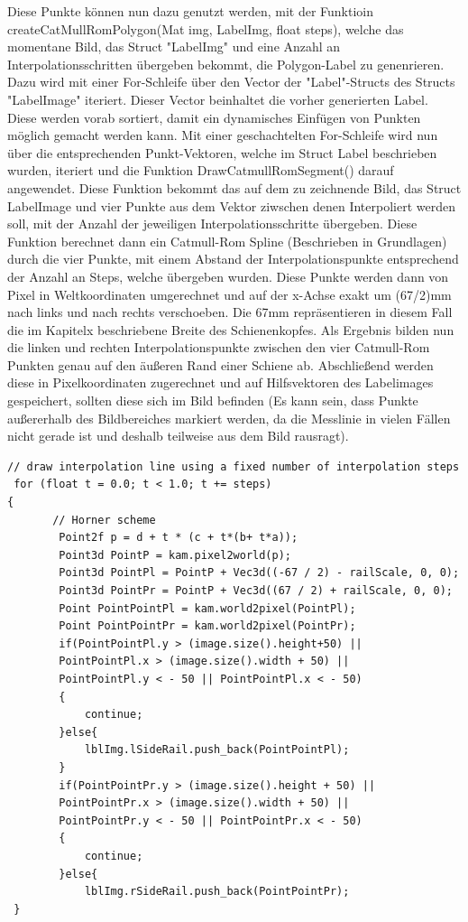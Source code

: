 \documentclass[11pt]{scrartcl}
\begin{document}
\noindent
Diese Punkte können nun dazu genutzt werden, mit der Funktioin createCatMullRomPolygon(Mat img, LabelImg, float steps), welche das momentane Bild, das Struct "LabelImg" und eine Anzahl an Interpolationsschritten übergeben bekommt, die Polygon-Label zu genenrieren. Dazu wird mit einer For-Schleife über den Vector der "Label"-Structs des Structs "LabelImage" iteriert. Dieser Vector beinhaltet die vorher generierten Label. Diese werden vorab sortiert, damit ein dynamisches Einfügen von Punkten möglich gemacht werden kann. Mit einer geschachtelten For-Schleife wird nun über die entsprechenden Punkt-Vektoren, welche im Struct Label beschrieben wurden, iteriert und die Funktion DrawCatmullRomSegment() darauf angewendet. Diese Funktion bekommt das auf dem zu zeichnende Bild, das Struct LabelImage und vier Punkte aus dem Vektor ziwschen denen Interpoliert werden soll, mit der Anzahl der jeweiligen Interpolationsschritte übergeben. Diese Funktion berechnet dann ein Catmull-Rom Spline (Beschrieben in Grundlagen) durch die vier Punkte, mit einem Abstand der Interpolationspunkte entsprechend der Anzahl an Steps, welche übergeben wurden. Diese Punkte werden dann von Pixel in Weltkoordinaten umgerechnet und auf der x-Achse exakt um (67/2)mm nach links und nach rechts verschoeben. Die 67mm repräsentieren in diesem Fall die im Kapitelx beschriebene Breite des Schienenkopfes. Als Ergebnis bilden nun die linken und rechten Interpolationspunkte zwischen den vier Catmull-Rom Punkten genau auf den äußeren Rand einer Schiene ab. Abschließend werden diese in Pixelkoordinaten zugerechnet und auf Hilfsvektoren des Labelimages gespeichert, sollten diese sich im Bild befinden (Es kann sein, dass Punkte außererhalb des Bildbereiches markiert werden, da die Messlinie in vielen Fällen nicht gerade ist und deshalb teilweise aus dem Bild rausragt). 
\begin{lstlisting}  
// draw interpolation line using a fixed number of interpolation steps
 for (float t = 0.0; t < 1.0; t += steps)
{   
       // Horner scheme
        Point2f p = d + t * (c + t*(b+ t*a));
        Point3d PointP = kam.pixel2world(p);
        Point3d PointPl = PointP + Vec3d((-67 / 2) - railScale, 0, 0);
        Point3d PointPr = PointP + Vec3d((67 / 2) + railScale, 0, 0);
        Point PointPointPl = kam.world2pixel(PointPl);
        Point PointPointPr = kam.world2pixel(PointPr);
        if(PointPointPl.y > (image.size().height+50) || 
        PointPointPl.x > (image.size().width + 50) ||
        PointPointPl.y < - 50 || PointPointPl.x < - 50)
        {
            continue;
        }else{
            lblImg.lSideRail.push_back(PointPointPl);
        }
        if(PointPointPr.y > (image.size().height + 50) ||
        PointPointPr.x > (image.size().width + 50) ||
        PointPointPr.y < - 50 || PointPointPr.x < - 50)
        {  
            continue;
        }else{
            lblImg.rSideRail.push_back(PointPointPr);
 }
\end{lstlisting}
\end{document}
